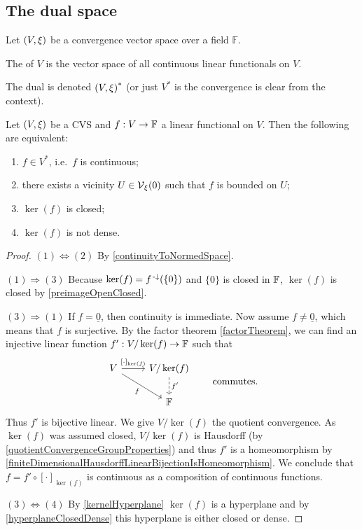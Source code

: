 \subsection{The dual space}
\begin{definition}
Let $\left( V,\xi \right)$ be a convergence vector space over a field $\mathbb{F}$.

The  of $V$ is the vector space of all continuous linear functionals on $V$.

The dual is denoted $\left( V,\xi \right)^{*}$ (or just $V^*$ is the convergence is clear from the context).
\end{definition}

\begin{proposition} \label{continuityLinearFunctionals}
Let $\left( V, \xi \right)$ be a CVS and $f:V\to \mathbb{F}$ a linear functional on $V$. Then the following are equivalent:
\begin{enumerate}
\item $f\in V^{*}$, i.e.\ $f$ is continuous;
\item there exists a vicinity $U\in \operatorname{\mathcal{V}}_\xi(0)$ such that $f$ is bounded on $U$;
\item $\ker(f)$ is closed;
\item $\ker(f)$ is not dense.
\end{enumerate}
\end{proposition}
\begin{proof}
$(1) \Leftrightarrow (2)$ By \ref{continuityToNormedSpace}.

$(1) \Rightarrow (3)$ Because $\ker(f) = f^{{\text{\hspace{0.15em}-}\downarrow}}(\{0\})$ and $\{0\}$ is closed in $\mathbb{F}$, $\ker(f)$ is closed by \ref{preimageOpenClosed}.

$(3) \Rightarrow (1)$ If $f = \underline{0}$, then continuity is immediate. Now assume $f \neq \underline{0}$, which means that $f$ is surjective. By the factor theorem \ref{factorTheorem}, we can find an injective linear function $f': V/\ker(f)\to \mathbb{F}$ such that
\[ \begin{tikzcd}
V \arrow[r, "{[\cdot]_{\ker(f)}}"] \arrow[dr, swap, "f"] & V/\ker(f) \arrow[d, dashed, "{f'}"] \\
& \F
\end{tikzcd} \qquad\text{commutes.} \]
Thus $f'$ is bijective linear. We give $V/\ker(f)$ the quotient convergence. As $\ker(f)$ was assumed closed, $V/\ker(f)$ is Hausdorff (by \ref{quotientConvergenceGroupProperties}) and thus $f'$ is a homeomorphism by \ref{finiteDimensionalHausdorffLinearBijectionIsHomeomorphism}. We conclude that $f= f'\circ [\cdot]_{\ker(f)}$ is continuous as a composition of continuous functions.

$(3) \Leftrightarrow (4)$ By \ref{kernelHyperplane} $\ker(f)$ is a hyperplane and by \ref{hyperplaneClosedDense} this hyperplane is either closed or dense.
\end{proof}

